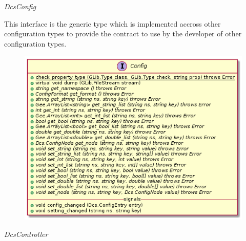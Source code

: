       \emph{DcsConfig}

      \vspace*{-0.75cm}
      \begin{minipage}[t]{0.5\textwidth}
        \vspace*{0.5cm}
        This interface is the generic type which is implemented accross other
        configuration types to provide the contract to use by the developer of
        other configuration types.
      \end{minipage} \hfill
      \begin{minipage}[t]{0.45\textwidth}
        \begin{figure}[H]
          \includegraphics[width=\textwidth]{figures/design/class/core/config}
          \label{fig:dsg-classes-config}
        \end{figure}
      \end{minipage}

      \emph{DcsController}

